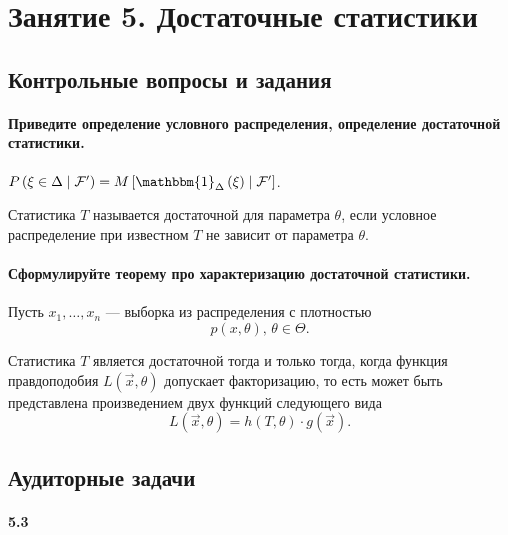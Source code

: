 \chapter*{Занятие 5. Достаточные статистики}

\section*{Контрольные вопросы и задания}

\subsubsection*{Приведите определение условного распределения, определение достаточной статистики.}

$P \left( \xi \in \Delta \; \middle| \; \mathcal{F'} \right) =
  M \left[ \mathbbm{1}_{ \Delta } \left( \xi \right) \; \middle| \; \mathcal{F'} \right] $.

Статистика $T$ называется достаточной для параметра $ \theta $,
если условное распределение при известном $T$ не зависит от параметра $ \theta $.

\subsubsection*{Сформулируйте теорему про характеризацию достаточной статистики.}

Пусть $x_1, \dotsc, x_n$ ---
выборка из распределения с плотностью
$$p \left( x, \theta \right), \,
  \theta \in \Theta.$$

Статистика $T$ является достаточной тогда и только тогда,
когда функция правдоподобия $L \left( \vec{x}, \theta \right) $ допускает факторизацию,
то есть может быть представлена произведением двух функций следующего вида
$$L \left( \vec{x}, \theta \right) =
  h \left( T, \theta \right) \cdot g \left( \vec{x} \right).$$

\section*{Аудиторные задачи}

\subsubsection{5.3}

